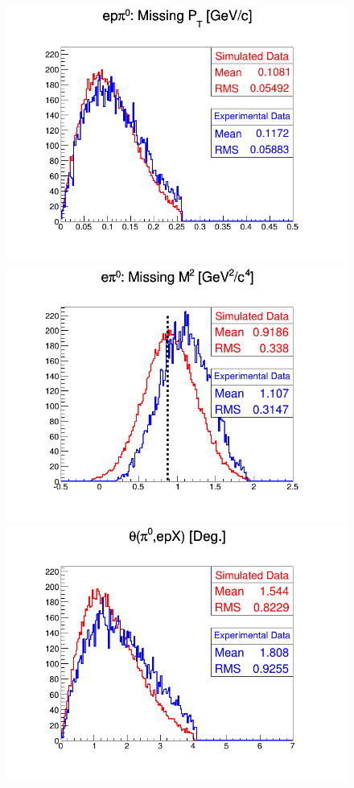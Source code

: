 \begin{figure}[h!]
\includegraphics[scale=0.35]{fig_dvcs/comp/InCoh_pi0_eppi0_PT_Mis.png}
\includegraphics[scale=0.35]{fig_dvcs/comp/InCoh_pi0_epi0_M2_Mis_InCoh.png}
\includegraphics[scale=0.35]{fig_dvcs/comp/InCoh_pi0_Theta_pi0X_InCoh.png}

\end{figure}
